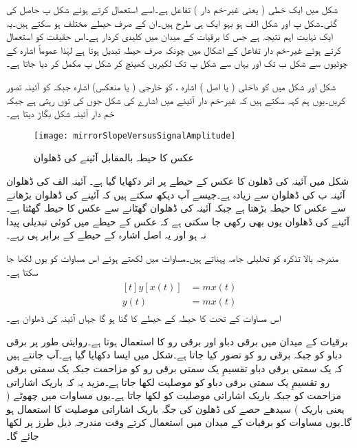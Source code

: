 شکل   میں  ایک خطی ( یعنی غیر-خم دار ) تفاعل ہے۔اسے استعمال کرتے ہوئے شکل  پ حاصل کی گئی۔شکل  پ اور شکل  الف ہو بہو ایک ہی طرح ہیں۔ان کے صرف حیطے مختلف ہو سکتے ہیں۔یہ ایک نہایت اہم نتیجہ ہے جس کا برقیات کے میدان میں کلیدی کردار ہے۔اس حقیقت کو استعمال کرتے ہوئے غیر-خم دار تفاعل کے اشکال میں چونکہ صرف حیطہ تبدیل ہوتا ہے لہٰذا عموماً اشارہ    کے چوٹیوں سے شکل  ب تک اور یہاں سے شکل  پ تک لکیریں کھینچ کر شکل  پ مکمل کر دیا جاتا ہے۔

شکل   اور شکل   میں  کو داخلی ( یا اصل ) اشارہ ،  کو خارجی ( یا منعکس) اشارہ جبکہ   کو آئینہ تصور کریں۔یوں ہم کہہ سکتے ہیں کہ غیر-خم دار آئینے میں اشارے کی شکل جوں کی توں رہتی ہے جبکہ خم دار آئینہ شکل بگاڑ دیتا ہے۔
\begin{figure}
\centering
\texttt{[image: mirrorSlopeVersusSignalAmplitude]}
\caption{عکس کا حیطہ بالمقابل آئینے کی ڈھلوان}
\label{شکل_عکس_کا_حیطہ_بالمقابل_ڈھلوان}
\end{figure}
شکل   میں آئینہ کی ڈھلون کا عکس کے حیطے پر اثر دکھایا گیا ہے۔ آئینہ  الف کی ڈھلوان آئینہ  ب کی ڈھلوان سے زیادہ ہے۔جیسے آپ دیکھ سکتے ہیں کہ آئینے کی ڈھلوان بڑھانے سے عکس کا حیطہ بڑھتا ہے جبکہ آئینہ کی ڈھلوان گھٹانے سے عکس کا حیطہ گھٹتا ہے۔آئینے کی ڈھلوان یوں بھی رکھی جا سکتی ہے کہ عکس کے حیطے میں کوئی تبدیلی پیدا نہ ہو اور یہ اصل اشارہ کے حیطے کے برابر ہی رہے۔

مندرجہ بالا تذکرہ کو تحلیلی جامہ پہناتے ہیں۔مساوات   میں   لکھتے ہوئے اس مساوات کو یوں لکھا جا سکتا ہے۔
\begin{gather}
\begin{aligned}[t]
y [x(t)]&=m x(t)\\
y(t)&=m x(t)
\end{aligned}
\end{gather}
اس مساوات کے تحت  کا حیطہ  کے حیطے کا  گنا ہو گا جہاں  آئینہ کی ڈھلوان ہے۔

برقیات کے میدان میں برقی دباو   اور برقی رو   کا استعمال ہوتا ہے۔روایتی طور پر برقی دباو کو  جبکہ برقی رو کو  تصور کیا جاتا ہے۔شکل   میں ایسا دکھایا گیا ہے۔آپ جانتے ہیں کہ  یک سمتی برقی دباو تقسیمِ یک سمتی برقی رو کو مزاحمت  جبکہ یک سمتی برقی رو تقسیمِ یک سمتی برقی دباو کو موصلیت  لکھا جاتا ہے۔مزید یہ کہ باریک اشاراتی مزاحمت کو  جبکہ باریک اشاراتی موصلیت کو  لکھا جاتا ہے۔یوں مساوات    میں چھوٹے ( یعنی باریک ) سیدھے حصے کی ڈھلون   کی جگہ باریک اشاراتی موصلیت   کا استعمال ہو گا۔یوں مساوات   کو برقیات کے میدان میں استعمال کرتے وقت مندرجہ ذیل طرز پر لکھا جائے گا۔

